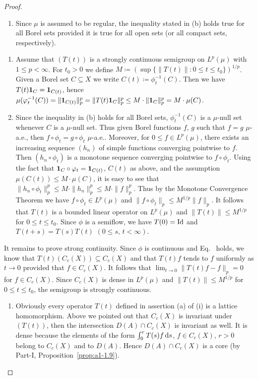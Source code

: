 \begin{proof}
\begin{enumerate}[\upshape (i), wide, labelindent=.25em]
\item
Since $\mu$ is assumed to be regular, the inequality stated in (b) holds true for all Borel sets provided it is true for all open sets (or all compact sets, respectively).
\end{enumerate}
\begin{enumerate}[wide, labelindent=.25em]

\item[$(a)\Rightarrow(b)$:] 
Assume that $(T(t))$ is a strongly continuous semigroup on
$L^p(\mu)$ with $1 \leq p < \infty$. For $t_0 > 0$ we define $M \coloneq  (\sup\{\|T(t)\| \colon 0 \leq t \leq t_0\})^{1/p}$.
Given a Borel set $C \subseteq X$ we write $C(t) \coloneq  \phi_t^{-1}(C)$.
Then we have $T(t)\mathbf{1}_C = \mathbf{1}_{C(t)}$, hence
$\mu(\phi_t^{-1}(C)) = \|\1_{C(t)}\|_p^p = \|T(t)\1_C\|_p^p \leq M \cdot \|\1_C\|_p^p = M \cdot \mu(C)$.

\item[$(b)\Rightarrow(a)$:] 
Since the inequality in (b) holds for all Borel sets,
$\phi_t^{-1}(C)$ is a $\mu$-null set whenever $C$ is a $\mu$-null set. 
Thus given
Borel functions $f$, $g$ such that $f = g$ $\mu$-a.e., then $f \circ \phi_t = g \circ \phi_t$
$\mu$-a.e.. 
Moreover, for $0 \leq f \in L^p(\mu)$, there exists an increasing
sequence $(h_n)$ of simple functions converging pointwise to $f$. Then
$(h_n \circ \phi_t)$ is a monotone sequence converging pointwise to $f \circ \phi_t$. Using
the fact that $\1_C \circ \phi_t = \1_{C(t)}$, $C(t)$ as above, and the assumption
$\mu(C(t)) \leq M \cdot \mu(C)$, it is easy to see that $\|h_n \circ \phi_t\|_p^p \leq M \cdot \|h_n\|_p^p \leq M \cdot \|f\|_p^p$.
Thus by the Monotone Convergence Theorem we have $f \circ \phi_t \in L^p(\mu)$ and
$\|f \circ \phi_t\|_p \leq M^{1/p}\|f\|_p$. It follows that $T(t)$ is a bounded linear
operator on $L^p(\mu)$ and $\|T(t)\| \leq M^{1/p}$ for $0 \leq t \leq t_0$. Since $\phi$ is a
semiflow, we have $T(0) = \operatorname{Id} $ and $T(t+s) = T(s)T(t)$ $(0 \leq s,\,t < \infty)$. 
\end{enumerate}
It remains to prove strong continuity. Since $\phi$ is continuous and Eq.~
holds, we know that $T(t)(C_c(X)) \subseteq C_c(X)$ and that $T(t)f$ tends to $f$
uniformly as $t \to 0$ provided that $f \in C_c(X)$. It follows that
$\lim_{t \to 0}\|T(t)f - f\|_p = 0$ for $f \in C_c(X)$. Since $C_c(X)$ is dense in
$L^p(\mu)$ and $\|T(t)\| \leq M^{1/p}$ for $0 \leq t \leq t_0$, the semigroup is strongly
continuous.
\begin{enumerate}[\upshape (i), wide, labelindent=.25em, start=2]
\item
Obviously every operator $T(t)$ defined in assertion (a) of (i)
is a lattice homomorphism. Above we pointed out that $C_c(X)$ is
invariant under $(T(t))$, then the intersection $D(A) \cap C_c(X)$ is invariant as well. It
is dense because the elements of the form $\int_{0}^{r} T(s)f \mathop{}\!\mathrm{d}{s}$, $f \in C_c(X)$,
$r > 0$ belong to $C_c(X)$ and to $D(A)$. Hence $D(A) \cap C_c(X)$ is a core%
(by Part-I, Proposition~\ref{prop:a1-1.9}).
\qedhere
\end{enumerate}
\end{proof}
